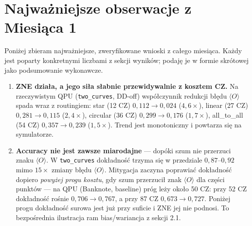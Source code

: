 \documentclass[11pt,a4paper]{article}
\begin{document}
\section{Najważniejsze obserwacje z Miesiąca 1}
\label{sec:takeaways}

Poniżej zbieram najważniejsze, zweryfikowane wnioski z całego miesiąca. Każdy jest poparty
konkretnymi liczbami z sekcji wyników; podaję je w formie skrótowej jako podsumowanie
wykonawcze.

\begin{enumerate}
\item \textbf{ZNE działa, a jego siła słabnie przewidywalnie z kosztem CZ.} Na rzeczywistym
      QPU (\texttt{two\_curves}, DD-off) współczynnik redukcji błędu $\langle O\rangle$ spada
      wraz z routingiem: star (12 CZ) $0{,}112\to0{,}024$ ($4{,}6\times$), linear (27 CZ)
      $0{,}281\to0{,}115$ ($2{,}4\times$), circular (36 CZ) $0{,}299\to0{,}176$ ($1{,}7\times$),
      all\_to\_all (54 CZ) $0{,}357\to0{,}239$ ($1{,}5\times$). Trend jest monotoniczny i
      powtarza się na symulatorze.

\item \textbf{Accuracy nie jest zawsze miarodajne} --- dopóki szum nie przerzuci znaku
      $\langle O\rangle$. W \texttt{two\_curves} dokładność trzyma się w przedziale
      $0{,}87$--$0{,}92$ mimo $15\times$ zmiany błędu $\langle O\rangle$. Mitygacja zaczyna
      poprawiać dokładność dopiero \emph{powyżej progu kosztu}, gdy szum przerzucił znak
      $\langle O\rangle$ dla części punktów --- na QPU (Banknote, baseline) próg leży około
      50 CZ: przy 52 CZ dokładność rośnie $0{,}706\to0{,}767$, a przy 87 CZ
      $0{,}673\to0{,}727$. Poniżej progu dokładność surowa jest już przy suficie i ZNE jej nie
      podnosi. To bezpośrednia ilustracja ram bias/wariancja z sekcji 2.1.


\end{enumerate}
\end{document}
